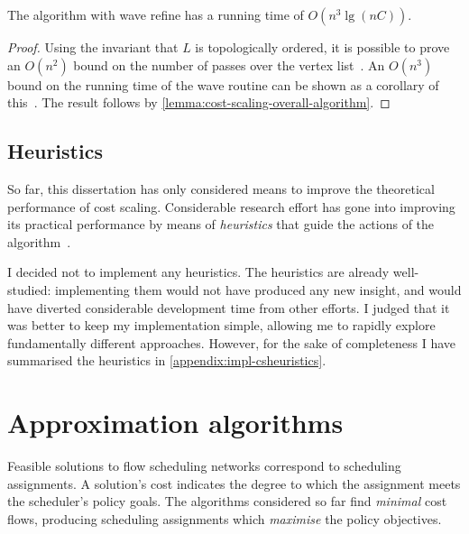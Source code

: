 \begin{thm} \label{thm:cost-scaling-wave-complexity}
The algorithm with wave refine has a running time of $O(n^3 \lg (nC))$.
\end{thm}
\begin{proof}
Using the invariant that $L$ is topologically ordered, it is possible to prove an $O(n^2)$ bound on the number of passes over the vertex list~\cite[lemma~7.3]{Goldberg:1987}. An $O(n^3)$ bound on the running time of the wave  routine can be shown as a corollary of this~\cite[theorem~7.4]{Goldberg:1987}. The result follows by \cref{lemma:cost-scaling-overall-algorithm}.
\end{proof}

\subsection{Heuristics}

So far, this dissertation has only considered means to improve the theoretical performance of cost scaling. Considerable research effort has gone into improving its practical performance by means of \emph{heuristics} that guide the actions of the algorithm~\cite{Goldberg:1997}.

I decided not to implement any heuristics. The heuristics are already well-studied: implementing them would not have produced any new insight, and would have diverted considerable development time from other efforts. I judged that it was better to keep my implementation simple, allowing me to rapidly explore fundamentally different approaches. However, for the sake of completeness I have summarised the heuristics in \cref{appendix:impl-csheuristics}.


\section{Approximation algorithms} \label{sec:impl-approx}


Feasible solutions to flow scheduling networks correspond to scheduling assignments. A solution's cost indicates the degree to which the assignment meets the scheduler's policy goals. The algorithms considered so far find \emph{minimal} cost flows, producing scheduling assignments which \emph{maximise} the policy objectives.


